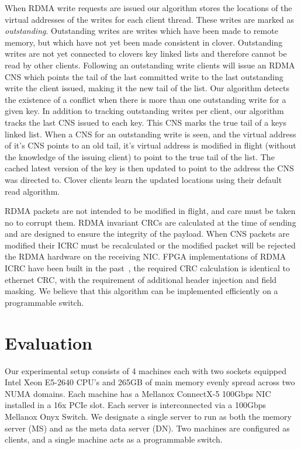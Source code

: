 When RDMA write requests are issued our algorithm stores the locations
of the virtual addresses of the writes for each client thread. These
writes are marked as \textit{outstanding}. Outstanding writes are
writes which have been made to remote memory, but which have not yet
been made consistent in clover. Outstanding writes are not yet
connected to clovers key linked lists and therefore cannot be read by
other clients. Following an outstanding write clients will issue an
RDMA CNS which points the tail of the last committed write to the last
outstanding write the client issued, making it the new tail of the
list. Our algorithm detects the existence of a conflict when there is
more than one outstanding write for a given key. In addition to
tracking outstanding writes per client, our algorithm tracks the last
CNS issued to each key. This CNS marks the true tail of a keys linked
list. When a CNS for an outstanding write is seen, and the virtual
address of it's CNS points to an old tail, it's virtual address is
modified in flight (without the knowledge of the issuing client) to
point to the true tail of the list. The cached latest version of the
key is then updated to point to the address the CNS was directed to.
Clover clients learn the updated locations using their default read
algorithm.

RDMA packets are not intended to be modified in flight, and care must
be taken no to corrupt them. RDMA invariant CRCs are calculated at the
time of sending and are designed to ensure the integrity of the
payload. When CNS packets are modified their ICRC must be recalculated
or the modified packet will be rejected the RDMA hardware on the
receiving NIC. FPGA implementations of RDMA ICRC have been built in
the past~\cite{Mansour_2019}, the required CRC calculation is
identical to ethernet CRC, with the requirement of additional header
injection and field masking. We believe that this algorithm can be
implemented efficiently on a programmable switch.

\section{Evaluation}

Our experimental setup consists of 4 machines each with two sockets
equipped Intel Xeon E5-2640 CPU's and 265GB of main memory evenly
spread across two NUMA domains. Each machine has a Mellanox ConnectX-5
100Gbps NIC installed in a 16x PCIe slot. Each server is
interconnected via a 100Gbps Mellanox Onyx Switch. We designate a
single server to run as both the memory server (MS) and as the meta
data server (DN). Two machines are configured as clients, and a single
machine acts as a programmable switch.

